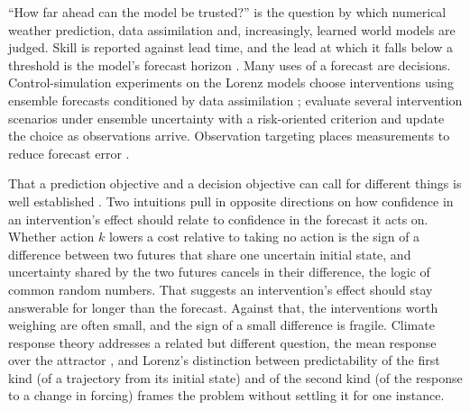 \documentclass[11pt]{article}
\begin{document}
``How far ahead can the model be trusted?'' is the question by which numerical weather prediction, data assimilation and, increasingly, learned world models \citep{ha2018world,lecun2022path} are judged. Skill is reported against lead time, and the lead at which it falls below a threshold is the model's forecast horizon \citep{palmer2000predicting,lam2023learning}. Many uses of a forecast are decisions. Control-simulation experiments on the Lorenz models choose interventions using ensemble forecasts conditioned by data assimilation \citep{miyoshi2022control,sun2023control}; \citet{mitsui2025bottomup} evaluate several intervention scenarios under ensemble uncertainty with a risk-oriented criterion and update the choice as observations arrive. Observation targeting places measurements to reduce forecast error \citep{lorenz1998optimal,xie2013observing,saito2026sparse,hashimoto2026forecast}.

That a prediction objective and a decision objective can call for different things is well established \citep{donti2017task}. Two intuitions pull in opposite directions on how confidence in an intervention's effect should relate to confidence in the forecast it acts on. Whether action $k$ lowers a cost relative to taking no action is the sign of a difference between two futures that share one uncertain initial state, and uncertainty shared by the two futures cancels in their difference, the logic of common random numbers. That suggests an intervention's effect should stay answerable for longer than the forecast. Against that, the interventions worth weighing are often small, and the sign of a small difference is fragile. Climate response theory addresses a related but different question, the mean response over the attractor \citep{leith1975climate,majda2010high,marconi2008fluctuation}, and Lorenz's distinction between predictability of the first kind (of a trajectory from its initial state) and of the second kind (of the response to a change in forcing) \citep{lorenz1975climatic} frames the problem without settling it for one instance.
\end{document}
